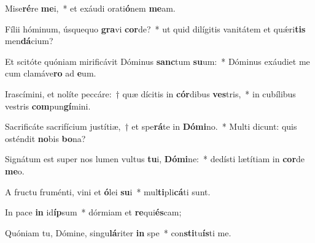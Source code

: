\item Mise\textbf{ré}re \textbf{me}i,~* et exáudi orati\textbf{ó}nem \textbf{me}am.
\item Fílii hóminum, úsquequo \textbf{gra}vi \textbf{cor}de?~* ut quid dilígitis vanitátem et quǽri\textbf{tis} men\textbf{dá}cium?
\item Et scitóte quóniam mirificávit Dóminus \textbf{sanc}tum \textbf{su}um:~* Dóminus exáudiet me cum clamáve\textbf{ro} ad \textbf{e}um.
\item Irascímini, et nolíte peccáre:~† quæ dícitis in \textbf{cór}dibus \textbf{ves}tris,~* in cubílibus vestris \textbf{com}pun\textbf{gí}mini.
\item Sacrificáte sacrifícium justítiæ,~† et spe\textbf{rá}te in \textbf{Dó}\textbf{mi}no.~* Multi dicunt: quis osténdit \textbf{no}bis \textbf{bo}na?
\item Signátum est super nos lumen vultus \textbf{tu}i, \textbf{Dó}\textbf{mi}ne:~* dedísti lætítiam in \textbf{cor}de \textbf{me}o.
\item A fructu fruménti, vini et \textbf{ó}lei \textbf{su}i~* mul\textbf{ti}pli\textbf{cá}ti sunt.
\item In pace \textbf{in} id\textbf{íp}sum~* dórmiam et \textbf{re}qui\textbf{és}cam;
\item Quóniam tu, Dómine, singu\textbf{lá}riter \textbf{in} spe~* con\textbf{sti}tu\textbf{ís}ti me.
